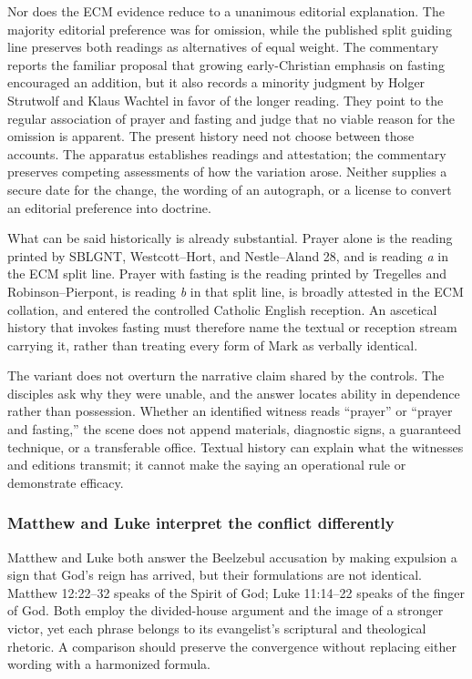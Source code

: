 Nor does the ECM evidence reduce to a unanimous editorial explanation. The
majority editorial preference was for omission, while the published split
guiding line preserves both readings as alternatives of equal weight. The
commentary reports the familiar
proposal that growing early-Christian emphasis on fasting encouraged an
addition, but it also records a minority judgment by Holger Strutwolf and
Klaus Wachtel in favor of the longer reading. They point to the regular
association of prayer and fasting and judge that no viable reason for the
omission is apparent. The present history need not choose between those
accounts. The apparatus establishes readings and attestation; the commentary
preserves competing assessments of how the variation arose. Neither supplies
a secure date for the change, the wording of an autograph, or a license to
convert an editorial preference into doctrine.

What can be said historically is already substantial. Prayer alone is the
reading printed by SBLGNT, Westcott--Hort, and Nestle--Aland 28, and is
reading \emph{a} in the ECM split line. Prayer with fasting is the reading
printed by Tregelles and Robinson--Pierpont, is reading \emph{b} in that
split line, is broadly attested in the ECM collation, and entered the
controlled Catholic English reception. An ascetical history that invokes
fasting must therefore name the textual or reception stream carrying it,
rather than treating every form of Mark as verbally identical.

The variant does not overturn the narrative claim shared by the controls.
The disciples ask why they were unable, and the answer locates ability in
dependence rather than possession. Whether an identified witness reads
``prayer'' or ``prayer and fasting,'' the scene does not append materials,
diagnostic signs, a guaranteed technique, or a transferable office. Textual
history can explain what the witnesses and editions transmit; it cannot make
the saying an operational rule or demonstrate efficacy.

\subsubsection{Matthew and Luke interpret the conflict differently}

Matthew and Luke both answer the Beelzebul accusation by making expulsion a
sign that God's reign has arrived, but their formulations are not identical.
Matthew 12:22--32 speaks of the Spirit of God; Luke 11:14--22 speaks of the
finger of God. Both employ the divided-house argument and the image of a
stronger victor, yet each phrase belongs to its evangelist's scriptural and
theological rhetoric. A comparison should preserve the convergence without
replacing either wording with a harmonized formula.

